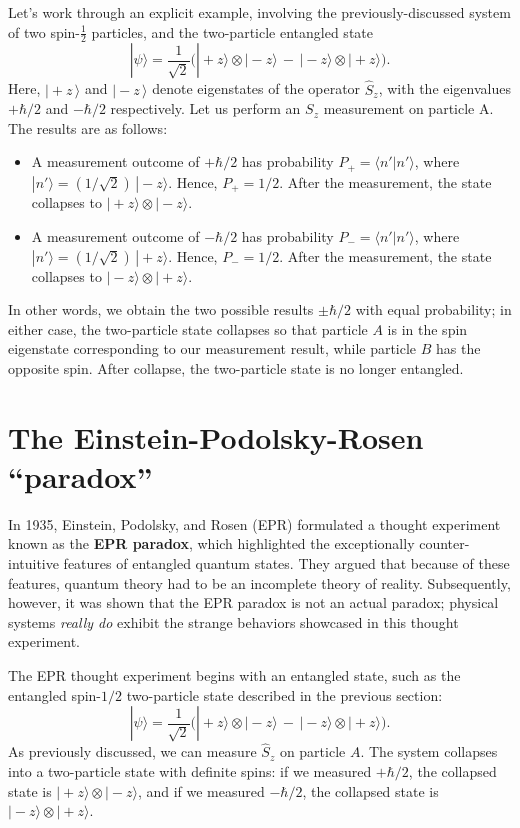 \documentclass[pra,11pt]{revtex4}
\begin{document}
Let's work through an explicit example, involving the
previously-discussed system of two spin-$\frac{1}{2}$ particles, and
the two-particle entangled state
$$|\psi\rangle = \frac{1}{\sqrt{2}} \Big(|\!+\!z\rangle\otimes|\!-\!z\rangle \,-\, |\!-\!z\rangle\otimes|\!+\!z\rangle\Big).$$
Here, $|\!+\!z\,\rangle$ and $|\!-\!z\,\rangle$ denote eigenstates
of the operator $\hat{S}_z$, with the eigenvalues $+\hbar/2$ and $-\hbar/2$
respectively.  Let us perform an $S_z$ measurement on particle A.  The
results are as follows:
\begin{itemize}
\item A measurement outcome of $+\hbar/2$ has probability $P_+ = \langle
  n'|n'\rangle$, where $|n'\rangle =
  (1/\sqrt{2})\,|\!-\!z\rangle$.  Hence, $P_+ = 1/2$.  After the
  measurement, the state collapses to $|\!+\!z\rangle
  \otimes|\!-\!z\rangle$.

\item A measurement outcome of $-\hbar/2$ has probability $P_- = \langle
  n'|n'\rangle$, where $|n'\rangle =
  (1/\sqrt{2})\,|\!+\!z\rangle$.  Hence, $P_- = 1/2$.  After the
  measurement, the state collapses to $|\!-\!z\rangle
  \otimes|\!+\!z\rangle$.
\end{itemize}
In other words, we obtain the two possible results $\pm \hbar/2$ with
equal probability; in either case, the two-particle state collapses so
that particle $A$ is in the spin eigenstate corresponding to our
measurement result, while particle $B$ has the opposite spin.  After
collapse, the two-particle state is no longer entangled.

\section{The Einstein-Podolsky-Rosen ``paradox''}

In 1935, Einstein, Podolsky, and Rosen (EPR) formulated a thought
experiment known as the \textbf{EPR paradox}, which highlighted the
exceptionally counter-intuitive features of entangled quantum states.
They argued that because of these features, quantum theory had to be
an incomplete theory of reality.  Subsequently, however, it was shown
that the EPR paradox is not an actual paradox; physical systems
\textit{really do} exhibit the strange behaviors showcased in this
thought experiment.

The EPR thought experiment begins with an entangled state, such as the
entangled spin-$1/2$ two-particle state described in the previous section:
$$|\psi\rangle = \frac{1}{\sqrt{2}} \Big(|\!+\!z\rangle\otimes|\!-\!z\rangle \,-\, |\!-\!z\rangle\otimes|\!+\!z\rangle\Big).$$
As previously discussed, we can measure $\hat{S}_z$ on particle $A$.
The system collapses into a two-particle state with definite spins: if
we measured $+\hbar/2$, the collapsed state is $|\!+\!z\rangle
\otimes|\!-\!z\rangle$, and if we measured $-\hbar/2$, the collapsed
state is $|\!-\!z\rangle\otimes|\!+\!z\rangle$.
\end{document}
